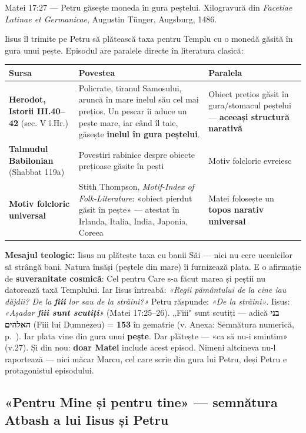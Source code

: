 \documentclass[12pt,a4paper,twoside,openany]{book}
\begin{document}
Matei 17:27 — Petru găsește moneda în gura peștelui. Xilogravură din \textit{Facetiae Latinae et Germanicae}, Augustin Tünger, Augsburg, 1486.

Iisus îl trimite pe Petru să plătească taxa pentru Templu cu o monedă găsită în gura unui pește. Episodul are paralele directe în literatura clasică:

\begin{center}
\small
\begin{tabular}{L{2.2cm}L{8.6cm}L{4.1cm}}
\toprule
{}
\textbf{Sursa} & \textbf{Povestea} & \textbf{Paralela} \\
\midrule
\textbf{Herodot, Istorii III.40–42} (sec. V î.Hr.) & Policrate, tiranul Samosului, aruncă în mare inelul său cel mai prețios. Un pescar îi aduce un pește mare, iar când îl taie, găsește \textbf{inelul în gura peștelui}. & Obiect prețios găsit în gura/stomacul peștelui — \textbf{aceeași structură narativă} \\
\textbf{Talmudul Babilonian} (Shabbat 119a) & Povestiri rabinice despre obiecte prețioase găsite în pești & Motiv folcloric evreiesc \\
\textbf{Motiv folcloric universal} & Stith Thompson, \textit{Motif-Index of Folk-Literature}: «obiect pierdut găsit în pește» — atestat în Irlanda, Italia, India, Japonia, Coreea & Matei folosește un \textbf{topos narativ universal} \\
\bottomrule
\end{tabular}
\end{center}
\normalsize
\textbf{Mesajul teologic:} Iisus nu plătește taxa cu banii Săi — nici nu cere ucenicilor să strângă bani. Natura însăși (peștele din mare) îi furnizează plata. E o afirmație de \textbf{suveranitate cosmică}: Cel pentru Care s-a făcut marea și peștii nu datorează taxă Templului. Iar Iisus întreabă: \textit{«Regii pământului de la cine iau dăjdii? De la \textbf{fiii} lor sau de la străini?»} Petru răspunde: \textit{«De la străini»}. Iisus: \textit{«Așadar \textbf{fiii sunt scutiți}»} (Matei 17:25--26). „Fiii" sunt scutiți — adică \textbf{בני האלהים} (Fiii lui Dumnezeu) = \textbf{153} în gematrie (v. Anexa: Semnătura numerică, p.~\pageref{semnatura}). Iar plata vine din gura unui \textbf{pește}. Dar plătește — «ca să nu-i smintim» (v.27). Și din nou: \textbf{doar Matei} include acest episod. Nimeni altcineva nu-l raportează — nici măcar Marcu, cel care scrie din gura lui Petru, deși Petru e protagonistul episodului.

\subsection*{«\textbf{Pentru Mine și pentru tine}» — semnătura Atbash a lui Iisus și Petru}
\end{document}

